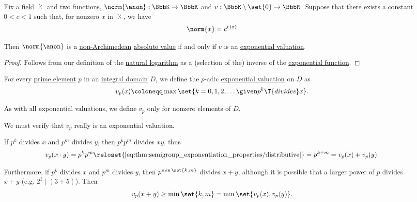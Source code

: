 \begin{proposition}\label{thm:exponential_and_additive_valuations}
  Fix a \hyperref[def:field]{field} \( \BbbK \) and two functions, \( \norm{\anon}: \BbbK \to \BbbR \) and \( v: \BbbK \setminus \set{ 0 } \to \BbbR \). Suppose that there exists a constant \( 0 < c < 1 \) such that, for nonzero \( x \) in \( \BbbK \), we have
  \begin{equation}\label{eq:thm:exponential_and_additive_valuations}
    \norm{x} = c^{v(x)}
  \end{equation}

  Then \( \norm{\anon} \) is a \hyperref[def:non_archimedean_absolute_value]{non-Archimedean} \hyperref[def:absolute_value]{absolute value} if and only if \( v \) is an \hyperref[def:exponential_valuation]{exponential valuation}.
\end{proposition}
\begin{proof}
  Follows from our definition of the \hyperref[def:logarithm]{natural logarithm} as a (selection of the) inverse of the \hyperref[def:exponential_function]{exponential function}.
\end{proof}

\begin{definition}\label{def:padic_valuation}
  For every \hyperref[def:domain_divisibility/prime]{prime element} \( p \) in an \hyperref[def:integral_domain]{integral domain} \( D \), we define the \( p \)-adic \hyperref[def:exponential_valuation]{exponential valuation} on \( D \) as
  \begin{equation}\label{eq:def:padic_valuation}
    v_p(x) \coloneqq \max\set{ k = 0, 1, 2, \ldots \given p^k \T{divides} x }.
  \end{equation}
\end{definition}
\begin{comments}
  \item As with all exponential valuations, we define \( v_p \) only for nonzero elements of \( D \).
\end{comments}
\begin{defproof}
  We must verify that \( v_p \) really is an exponential valuation.

   If \( p^k \) divides \( x \) and \( p^m \) divides \( y \), then \( p^k p^m \) divides \( xy \), thus
  \begin{equation*}
    v_p(x \cdot y)
    =
    p^k p^m
    \reloset {\eqref{eq:thm:semigroup_exponentiation_properties/distributive}} =
    p^{k + m}
    =
    v_p(x) + v_p(y).
  \end{equation*}

   Furthermore, if \( p^k \) divides \( x \) and \( p^m \) divides \( y \), then \( p^{\min\set{ k, m }} \) divides \( x + y \), although it is possible that a larger power of \( p \) divides \( x + y \) (e.g. \( 2^3 \mid (3 + 5) \)). Then
  \begin{equation*}
    v_p(x + y)
    \geq
    \min\set{ k, m }
    =
    \min\set{ v_p(x), v_p(y) }.
  \end{equation*}
\end{defproof}

